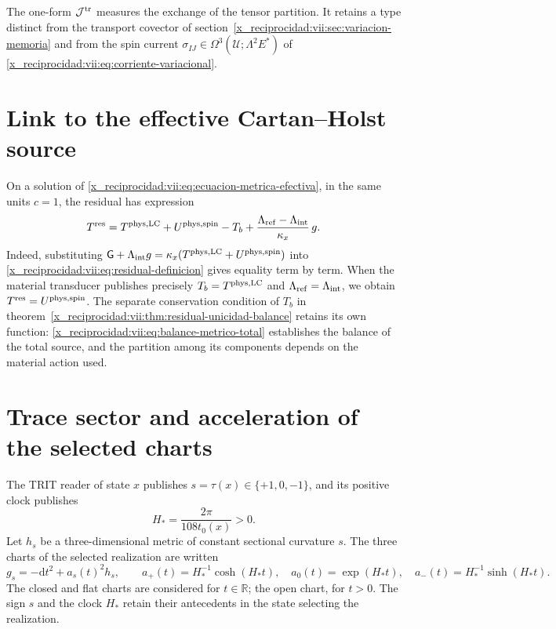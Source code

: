 The one-form \(\mathcal J^{\rm tr}\) measures the exchange of the tensor
partition. It retains a type distinct from the transport covector of
section~\ref{x_reciprocidad:vii:sec:variacion-memoria} and from the spin current
\(\sigma_{IJ}\in\Omega^3(\mathcal U;\Lambda^2E^*)\) of
\eqref{x_reciprocidad:vii:eq:corriente-variacional}.

\section{Link to the effective Cartan--Holst source}
\label{x_reciprocidad:vii:subsec:residual-fuente-cartan}

On a solution of \eqref{x_reciprocidad:vii:eq:ecuacion-metrica-efectiva}, in the
same units \(c=1\), the residual has expression
\begin{equation}
 T^{\rm res}
 =T^{\rm phys,LC}+U^{\rm phys,spin}-T_b
   +\frac{\Lambda_{\rm ref}-\Lambda_{\rm int}}{\kappa_x}\,g.
 \label{x_reciprocidad:vii:eq:residual-composicion-cartan}
\end{equation}
Indeed, substituting
\(\mathsf G+\Lambda_{\rm int}g
  =\kappa_x(T^{\rm phys,LC}+U^{\rm phys,spin})\)
into \eqref{x_reciprocidad:vii:eq:residual-definicion} gives equality term by term.
When the material transducer publishes precisely
\(T_b=T^{\rm phys,LC}\) and \(\Lambda_{\rm ref}=\Lambda_{\rm int}\),
we obtain \(T^{\rm res}=U^{\rm phys,spin}\).
The separate conservation condition of \(T_b\) in
theorem~\ref{x_reciprocidad:vii:thm:residual-unicidad-balance} retains its own
function: \eqref{x_reciprocidad:vii:eq:balance-metrico-total} establishes the balance of the
total source, and the partition among its components depends on the material
action used.

\section{Trace sector and acceleration of the selected charts}
\label{x_reciprocidad:vii:subsec:residual-aceleracion-ds}

The TRIT reader of state \(x\) publishes \(s=\tau(x)\in\{+1,0,-1\}\),
and its positive clock publishes
\begin{equation}
 H_*=\frac{2\pi}{108t_0(x)}>0.
 \label{x_reciprocidad:vii:eq:reloj-carta-ds}
\end{equation}
Let \(h_s\) be a three-dimensional metric of constant sectional curvature
\(s\). The three charts of the selected realization are written
\begin{equation}
 g_s=-\mathrm dt^2+a_s(t)^2h_s,\qquad
 a_+(t)=H_*^{-1}\cosh(H_*t),\quad
 a_0(t)=\exp(H_*t),\quad
 a_-(t)=H_*^{-1}\sinh(H_*t).
 \label{x_reciprocidad:vii:eq:cartas-ds-residual}
\end{equation}
The closed and flat charts are considered for \(t\in\mathbb R\);
the open chart, for \(t>0\). The sign \(s\) and the clock \(H_*\)
retain their antecedents in the state selecting the realization.

